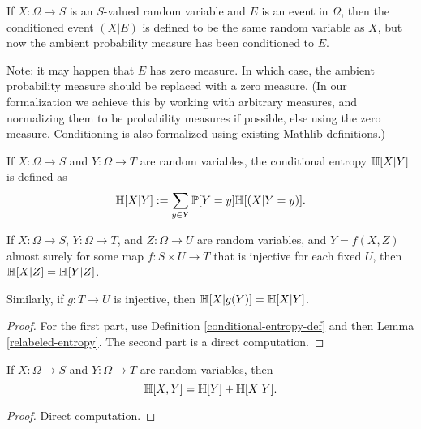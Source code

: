 \begin{definition}
  \label{condition-event-def}
  \leanok
  If $X: \Omega \to S$ is an $S$-valued random variable and $E$ is an event in $\Omega$, then the conditioned event $(X|E)$ is defined to be the same random variable as $X$, but now the ambient probability measure has been conditioned to $E$.
\end{definition}

Note: it may happen that $E$ has zero measure.  In which case, the ambient probability measure should be replaced with a zero measure.  (In our formalization we achieve this by working with arbitrary measures, and normalizing them to be probability measures if possible, else using the zero measure.  Conditioning is also formalized using existing Mathlib definitions.)

\begin{definition}
  \label{conditional-entropy-def}
  \leanok
  If $X: \Omega \to S$ and $Y: \Omega \to T$ are random variables, the conditional entropy $\mathbb{H}[X|Y]$ is defined as
  $$ \mathbb{H}[X|Y] := \sum_{y \in Y} \mathbb{P}[Y = y] \mathbb{H}[(X | Y=y)].$$
\end{definition}

\begin{lemma}\label{relabeled-entropy-cond}
  \leanok
  If $X: \Omega \to S$, $Y: \Omega \to T$, and $Z: \Omega \to U$ are random variables, and $Y = f(X,Z)$ almost surely for some map $f: S \times U \to T$ that is injective for each fixed $U$, then $\mathbb{H}[X|Z] = \mathbb{H}[Y|Z]$.

  Similarly, if $g: T \to U$ is injective, then $\mathbb{H}[X|g(Y)] = \mathbb{H}[X|Y]$.
\end{lemma}

\begin{proof}
  For the first part, use Definition \ref{conditional-entropy-def} and then Lemma \ref{relabeled-entropy}.  The second part is a direct computation.
\end{proof}


\begin{lemma}\label{chain-rule}
  \leanok
  If $X: \Omega \to S$ and $Y: \Omega \to T$ are random variables, then
  $$ \mathbb{H}[X, Y] = \mathbb{H}[Y] + \mathbb{H}[X|Y].$$
  \end{lemma}
  \begin{proof}
  \leanok
  Direct computation.
\end{proof}

